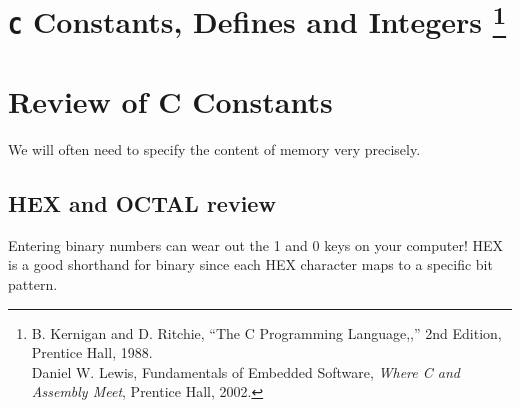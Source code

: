 %
%
%
%
%
%
%
%
%
%
%
\section*{{\tt C} Constants, Defines and Integers \footnote{
 B. Kernigan and D. Ritchie, ``The C Programming Language,,''
 2nd Edition, Prentice Hall, 1988.  \\
 Daniel W. Lewis, Fundamentals of
 Embedded Software, {\it Where C and Assembly Meet}, Prentice Hall, 2002.}
 }


\section{Review of C Constants}

We will often need to specify the content of memory
very precisely.

\subsection{HEX and OCTAL review}

Entering binary numbers can wear out the 1 and 0 keys on
your computer!   HEX is a good shorthand for binary since
each HEX character maps to a specific bit pattern.


